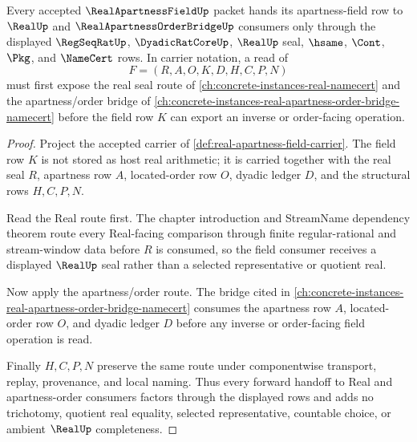 \begin{theorem}
\label{thm:real-apartness-field-real-order-forward-link}
Every accepted $\RealApartnessFieldUp$ packet hands its apartness-field row to $\RealUp$ and $\RealApartnessOrderBridgeUp$ consumers only through the displayed $\RegSeqRatUp$, $\DyadicRatCoreUp$, $\RealUp$ seal, $\hsame$, $\Cont$, $\Pkg$, and $\NameCert$ rows. In carrier notation, a read of
$$
F=(R,A,O,K,D,H,C,P,N)
$$
must first expose the real seal route of \autoref{ch:concrete-instances-real-namecert} and the apartness/order bridge of \autoref{ch:concrete-instances-real-apartness-order-bridge-namecert} before the field row $K$ can export an inverse or order-facing operation.
\end{theorem}
\begin{proof}
Project the accepted carrier of \autoref{def:real-apartness-field-carrier}. The field row $K$ is not stored as host real arithmetic; it is carried together with the real seal $R$, apartness row $A$, located-order row $O$, dyadic ledger $D$, and the structural rows $H,C,P,N$.

Read the Real route first. The chapter introduction and StreamName dependency theorem route every Real-facing comparison through finite regular-rational and stream-window data before $R$ is consumed, so the field consumer receives a displayed $\RealUp$ seal rather than a selected representative or quotient real.

Now apply the apartness/order route. The bridge cited in \autoref{ch:concrete-instances-real-apartness-order-bridge-namecert} consumes the apartness row $A$, located-order row $O$, and dyadic ledger $D$ before any inverse or order-facing field operation is read.

Finally $H,C,P,N$ preserve the same route under componentwise transport, replay, provenance, and local naming. Thus every forward handoff to Real and apartness-order consumers factors through the displayed rows and adds no trichotomy, quotient real equality, selected representative, countable choice, or ambient $\RealUp$ completeness.
\end{proof}
